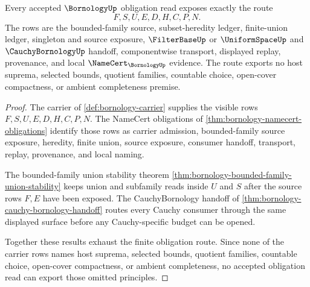 \begin{theorem}
\label{thm:bornology-obligation-closure-route}
Every accepted $\BornologyUp$ obligation read exposes exactly the route
$$
F,S,U,E,D,H,C,P,N.
$$
The rows are the bounded-family source, subset-heredity ledger, finite-union ledger, singleton and source exposure, $\FilterBaseUp$ or $\UniformSpaceUp$ and $\CauchyBornologyUp$ handoff, componentwise transport, displayed replay, provenance, and local $\NameCert_{\BornologyUp}$ evidence. The route exports no host suprema, selected bounds, quotient families, countable choice, open-cover compactness, or ambient completeness premise.
\end{theorem}
\begin{proof}
The carrier of \autoref{def:bornology-carrier} supplies the visible rows $F,S,U,E,D,H,C,P,N$. The NameCert obligations of \autoref{thm:bornology-namecert-obligations} identify those rows as carrier admission, bounded-family source exposure, heredity, finite union, source exposure, consumer handoff, transport, replay, provenance, and local naming.

The bounded-family union stability theorem \autoref{thm:bornology-bounded-family-union-stability} keeps union and subfamily reads inside $U$ and $S$ after the source rows $F,E$ have been exposed. The CauchyBornology handoff of \autoref{thm:bornology-cauchy-bornology-handoff} routes every Cauchy consumer through the same displayed surface before any Cauchy-specific budget can be opened.

Together these results exhaust the finite obligation route. Since none of the carrier rows names host suprema, selected bounds, quotient families, countable choice, open-cover compactness, or ambient completeness, no accepted obligation read can export those omitted principles.
\end{proof}


